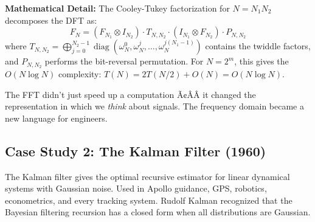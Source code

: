 \textbf{Mathematical Detail:} The Cooley-Tukey factorization for $N = N_1 N_2$ decomposes the DFT as:
\[
F_N = (F_{N_1} \otimes I_{N_2}) \cdot T_{N,N_2} \cdot (I_{N_1} \otimes F_{N_2}) \cdot P_{N,N_2}
\]
where $T_{N,N_2} = \bigoplus_{j=0}^{N_2-1} \operatorname{diag}(\omega_N^{0}, \omega_N^{j}, \dots, \omega_N^{j(N_1-1)})$ contains the twiddle factors, and $P_{N,N_2}$ performs the bit-reversal permutation. For $N = 2^m$, this gives the $O(N \log N)$ complexity: $T(N) = 2T(N/2) + O(N) = O(N \log N)$.

\begin{mentalLeap}The FFT didn't just speed up a computation Ã¢ÂÂ it changed the representation in which we \emph{think} about signals. The frequency domain became a new language for engineers.\end{mentalLeap}

\subsection{Case Study 2: The Kalman Filter (1960)}

The Kalman filter gives the optimal recursive estimator for linear dynamical systems with Gaussian noise. Used in Apollo guidance, GPS, robotics, econometrics, and every tracking system. Rudolf Kalman recognized that the Bayesian filtering recursion has a closed form when all distributions are Gaussian.

